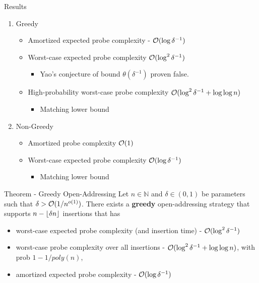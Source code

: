 \documentclass{beamer}
\begin{document}
\begin{frame}{Results}
	
	\begin{enumerate}
		\item Greedy
		\begin{itemize}
			\item Amortized expected probe complexity - ${\cal O}(\log{\delta^{-1}})$
			\item Worst-case expected probe complexity ${\cal O}(\log^2{\delta^{-1}})$
			\begin{itemize}
				\item \alert{Yao's conjecture of bound $\theta(\delta^{-1})$ proven false.}
			\end{itemize} 
			\item High-probability worst-case probe complexity ${\cal O}(\log^2{\delta^{-1}} + \log{\log{n}})$
			\begin{itemize}
				\item Matching lower bound
			\end{itemize}
		\end{itemize}
	\vspace{10mm}
	\item Non-Greedy 
	\begin{itemize}
		\item Amortized probe complexity ${\cal O}(1)$
		\item Worst-case expected probe complexity ${\cal O}(\log{\delta^{-1}})$ %
		\begin{itemize}
			\item Matching lower bound
		\end{itemize}
	\end{itemize}
	\end{enumerate}
\end{frame}


\begin{frame}
	\begin{block}{Theorem - Greedy Open-Addressing}
		Let $n \in \mathbb{N}$ and $\delta \in(0, 1)$ be parameters such that $\delta > 
		{\cal O}(1/n^{o(1)})$.
			 There exists a { \bf greedy} open-addressing strategy that supports $n - \left\lfloor \delta n \right\rfloor$ insertions that has 
			\begin{itemize}
				\item worst-case expected probe complexity (and insertion time) - ${\cal O}(\log^2{\delta^{-1}} )$ 
				\item worst-case probe complexity over all insertions - ${\cal O}(\log^2{\delta^{-1}} + \log{\log{n}})$, with prob $1- 1/poly(n)$, 
				\item amortized expected probe complexity - ${\cal O}(\log{\delta^{-1}})$
			\end{itemize}
		
	\end{block}
\end{frame}
\end{document}
